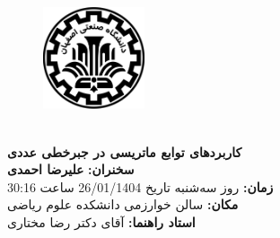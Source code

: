 \documentclass[12pt, a4paper]{article}
\begin{document}
\begin{titlepage}

\begin{center}

\vspace*{-3cm}
\begin{figure}[h]
\centering
\includegraphics[height=30mm]{./logo.jpg}
\end{figure}
\vspace{-5mm}
\\
\vspace{7mm}
{\Large
\textbf{کاربرد‌های توابع ماتریسی در جبر‌خطی عددی}
}
\\
\vspace{5mm}
\textbf{سخنران:}
\textbf{علیرضا احمدی}
\\
	\vspace{5mm}
\textbf{زمان:}
روز سه‌شنبه
\hspace{1cm}
تاریخ
26/01/1404
\hspace{1cm}
ساعت
30:16
\\
\vspace{3mm}
\textbf{مکان:}
سالن خوارزمی دانشکده علوم ریاضی
\\
\vspace{4mm}
\textbf{استاد راهنما:}
آقای دکتر رضا مختاری
\\

\end{center}
\end{titlepage}
\end{document}
